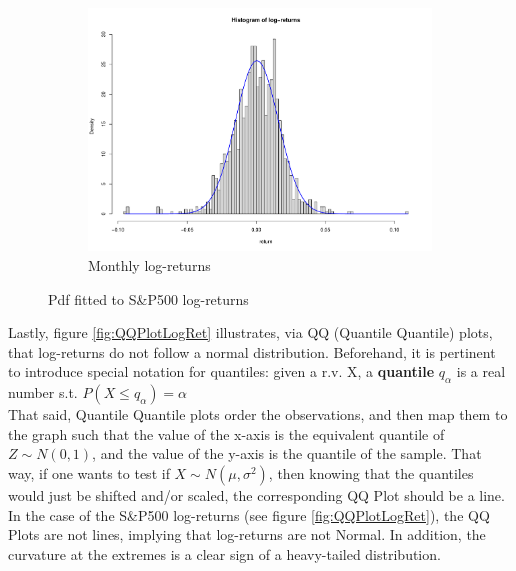 \begin{figure}[hbtp]
	\begin{subfigure}{\textwidth}
		\centering
		\includegraphics[scale=.2]{img/finData/histMonthlyLogRet}
		\caption{Monthly log-returns}
	\end{subfigure}
	
	\caption{Pdf fitted to S\&P500 log-returns}
	\label{fig:HistLogRet}
\end{figure}

Lastly, figure \ref{fig:QQPlotLogRet} illustrates, via QQ (Quantile 
Quantile) plots, that log-returns do not follow a normal distribution. 
Beforehand, it is pertinent to introduce special notation for quantiles:
given a r.v. X, a \textbf{quantile} $q_\alpha$ is a real number s.t. $P(X 
\leq q_\alpha) = \alpha$\\

That said, Quantile Quantile plots order the observations, and then map them 
to the graph such that the value of the x-axis is the equivalent quantile of 
$Z \sim N(0,1)$, and the value of the y-axis is the quantile of the sample. 
That way, if one wants to test if $X \sim N(\mu, \sigma^2)$, then knowing 
that the quantiles would just be shifted and/or scaled, the corresponding QQ 
Plot should be a line.\\

In the case of the S\&P500 log-returns (see figure \ref{fig:QQPlotLogRet}), 
the QQ Plots are not lines, implying that log-returns are not Normal. In 
addition, the curvature at the extremes is a clear sign of a heavy-tailed 
distribution.

